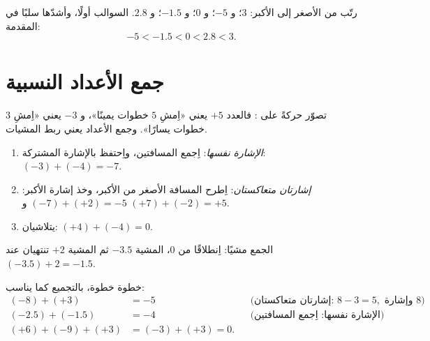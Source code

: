 \begin{example}\label{ex:g7:negatives:compare}
رتّب من الأصغر إلى الأكبر: $3$؛ و $-5$؛ و $0$؛ و $-1.5$؛ و $2.8$.
السوالب أولًا، وأشدّها سلبًا في المقدمة:
\[
-5 < -1.5 < 0 < 2.8 < 3 .
\]
\end{example}

\section{جمع الأعداد النسبية}

تصوّر  حركةً على : فالعدد $+5$ يعني
«اِمشِ $5$ خطوات يمينًا»، و $-3$ يعني «اِمشِ $3$ خطوات يسارًا». وجمع
الأعداد يعني ربط المشيات.

\begin{method}\label{met:g7:negatives:add}
\begin{enumerate}
  \item \emph{الإشارة نفسها}: اِجمع المسافتين، واِحتفظ بالإشارة المشتركة:
        $(-3) + (-4) = -7$.
  \item \emph{إشارتان متعاكستان}: اِطرح المسافة الأصغر من
        الأكبر، وخذ إشارة الأكبر:
        $(-7) + (+2) = -5$ و $(+7) + (-2) = +5$.
  \item {} يتلاشيان: $(+4) + (-4) = 0$.
\end{enumerate}
\end{method}

\begin{omfigure}

{\small الجمع مشيًا: اِنطلاقًا من $0$، المشية $-3.5$ ثم
المشية $+2$ تنتهيان عند $(-3.5) + 2 = -1.5$.}
\end{omfigure}

\begin{example}\label{ex:g7:negatives:add}
خطوة خطوة، بالتجميع كما يناسب:
\begin{align*}
(-8) + (+3) &= -5 && \text{(إشارتان متعاكستان: } 8 - 3 = 5,
\text{ وإشارة } 8)\\
(-2.5) + (-1.5) &= -4 && \text{(الإشارة نفسها: اِجمع المسافتين)}\\
(+6) + (-9) + (+3) &= (-3) + (+3) = 0 .
\end{align*}
\end{example}

